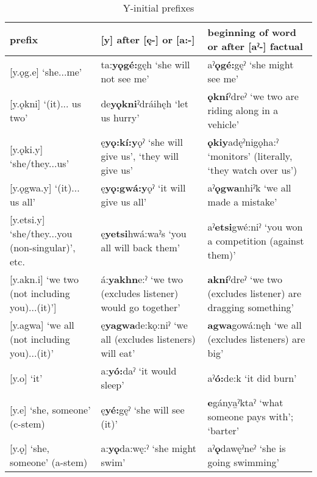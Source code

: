 \lipsum[1-1]



\begin{table}
\caption{Y-initial prefixes}
\label{tab:1:yinit}
\scriptsize{
\begin{tabularx}{\textwidth}{XXX}

\lsptoprule

prefix & [y] after [ę-] or [a:-] & beginning of word or after [aˀ-] factual\\
\midrule

\scriptsize{[y.ǫg.e] ‘she...me’} & \scriptsize{ta:\textbf{yǫgé:}gęh ‘she will not see me’} & \scriptsize{aˀ\textbf{ǫgé:}gęˀ ‘she might see me’}\\
\scriptsize{[y.ǫkni] ‘(it)... us two’} & \scriptsize{de\textbf{yǫkni}ˀdráihęh ‘let us hurry’} & \scriptsize{\textbf{ǫkní}ˀdreˀ ‘we two are riding along in a vehicle’}\\
\scriptsize{[y.ǫki.y] ‘she/they...us’} & \scriptsize{ę\textbf{yǫ:kí:y}ǫˀ ‘she will give us’, ‘they will give us’} & \scriptsize{\textbf{ǫkiy}adęˀnigǫha:ˀ ‘monitors’ (literally, ‘they watch over us’)}\\
\scriptsize{[y.ǫgwa.y] ‘(it)... us all’} & \scriptsize{ę\textbf{yǫ:gwá:y}ǫˀ ‘it will give us all’} & \scriptsize{aˀ\textbf{ǫgwa}nhiˀk ‘we all made a mistake’}\\
\scriptsize{[y.etsi.y] ‘she/they...you (non-singular)’, etc.} & \scriptsize{ę\textbf{yetsi}hwá:waˀs ‘you all will back them’} & \scriptsize{aˀ\textbf{etsi}gwé:niˀ ‘you won a competition (against them)’}\\
\scriptsize{[y.akn.i] ‘we two (not including you)...(it)’]} & \scriptsize{á:\textbf{yakhn}e:ˀ ‘we two (excludes listener) would go together’} & \scriptsize{\textbf{akní}ˀdreˀ ‘we two (excludes listener) are dragging something’}\\
\scriptsize{[y.agwa] ‘we all (not including you)...(it)’} & \scriptsize{ę\textbf{yagwa}de:kǫ:niˀ ‘we all (excludes listeners) will eat’} & \scriptsize{\textbf{agwa}gowá:nęh ‘we all (excludes listeners) are big’}\\
\scriptsize{[y.o] ‘it’} & \scriptsize{a:\textbf{yó:}daˀ ‘it would sleep’} & \scriptsize{aˀ\textbf{ó:}de:k ‘it did burn’}\\
\scriptsize{[y.e] ‘she, someone’ (c-stem)} & \scriptsize{ę\textbf{yé:}gęˀ ‘she will see (it)’} & \scriptsize{\textbf{e}gánya̱ˀktaˀ ‘what someone pays with’; ‘barter’}\\
\scriptsize{[y.ǫ] ‘she, someone’ (a-stem)} & \scriptsize{a:\textbf{yǫ}da:wę:ˀ ‘she might swim’} & \scriptsize{aˀ\textbf{ǫ}dawęˀneˀ ‘she is going swimming’}\\

\end{tabularx}}
\end{table}
